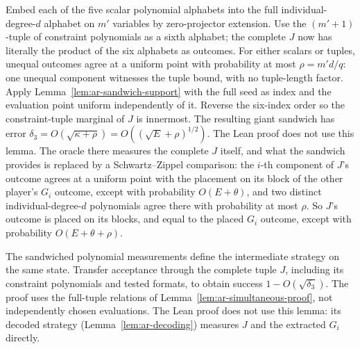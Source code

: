 \begin{lemma}
\label{lem:ar-giant-sandwich}
Embed each of the five scalar polynomial alphabets into the full
individual-degree-$d$ alphabet on $m'$ variables by zero-projector extension.
Use the $(m'+1)$-tuple of constraint polynomials as a sixth alphabet; the
complete $J$ now has literally the product of the six alphabets as outcomes.
For either scalars or tuples, unequal outcomes agree at a uniform point
with probability at most $\rho=m'd/q$: one unequal component witnesses
the tuple bound, with no tuple-length factor.
Apply Lemma~\ref{lem:ar-sandwich-support} with the full seed as index and
the evaluation point uniform independently of it. Reverse the six-index
order so the constraint-tuple marginal of $J$ is innermost. The resulting
giant sandwich has error
$\delta_3=O(\sqrt{\kappa+\rho})=O((\sqrt E+\rho)^{1/2})$.
The Lean proof does not use this lemma. The oracle there measures the complete $J$ itself, and
what the sandwich provides is replaced by a Schwartz--Zippel comparison: the $i$-th component of
$J$'s outcome agrees at a uniform point with the placement on its block of the other player's
$G_i$ outcome, except with probability $O(E+\theta)$, and two distinct individual-degree-$d$
polynomials agree there with probability at most $\rho$. So $J$'s outcome is placed on its
blocks, and equal to the placed $G_i$ outcome, except with probability $O(E+\theta+\rho)$.
\end{lemma}

\begin{lemma}
\label{lem:ar-polynomial-strategy}
The sandwiched polynomial measurements define the intermediate strategy on
the same state. Transfer acceptance through the complete tuple $J$,
including its constraint polynomials and tested formats, to obtain success
$1-O(\sqrt{\delta_3})$. The proof uses the full-tuple relations of
Lemma~\ref{lem:ar-simultaneous-proof}, not independently chosen evaluations.
The Lean proof does not use this lemma: its decoded strategy
(Lemma~\ref{lem:ar-decoding}) measures $J$ and the extracted $G_i$ directly.
\end{lemma}

